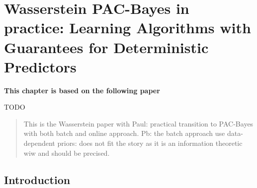 \chapter[Wasserstein PAC-Bayes in practice: Learning Algorithms with Guarantees for Deterministic Predictors]{Wasserstein PAC-Bayes in practice: Learning Algorithms with Guarantees for Deterministic Predictors}
\label{chap: wpb-practical}
\addchapterlof
\addchapterloe

\vspace{-2.0cm}
\begin{center}
\textbf{This chapter is based on the following paper}\\[-0.1cm]
\end{center}
TODO

\vspace{0.2cm}
\minitoc

\begin{abstract}
\vspace{-0.2cm}
This is the Wasserstein paper with Paul: practical transition to PAC-Bayes with both batch and online approach. Pb: the batch approach use data-dependent priors: does not fit the story as it is an information theoretic wiw and should be precised.
\end{abstract}

\newpage
    
\section{Introduction}
